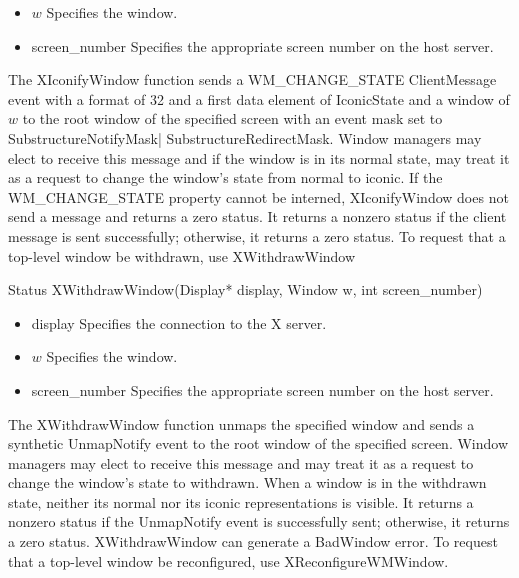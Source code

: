 \documentclass{report}
\begin{document}
\begin{itemize}
\begin{itemize}
\begin{itemize}
                \item $w$ Specifies the window.
                \item screen\_number Specifies the appropriate screen number on the host server.
            \end{itemize}
            The XIconifyWindow function sends a WM\_CHANGE\_STATE ClientMessage event with a format of 32 and a first data element of IconicState and a window of $w$ to the root window of the specified screen with an event mask set to SubstructureNotifyMask| SubstructureRedirectMask. Window managers may elect to receive this message and if the window is in its normal state, may treat it as a request to change the window’s state from normal to iconic. If the WM\_CHANGE\_STATE property cannot be interned, XIconifyWindow does not send a message and returns a zero status. It returns a nonzero status if the client message is sent successfully; otherwise, it returns a zero status.
            \bigbreak \noindent 
            To request that a top-level window be withdrawn, use XWithdrawWindow
            \bigbreak \noindent 
            \begin{cppcode}
            Status XWithdrawWindow(Display* display, Window w, int screen_number)
            \end{cppcode}
            \begin{itemize}
                \item display Specifies the connection to the X server.
                \item $w$ Specifies the window.
                \item screen\_number Specifies the appropriate screen number on the host server.
            \end{itemize}
            The XWithdrawWindow function unmaps the specified window and sends a synthetic UnmapNotify event to the root window of the specified screen. Window managers may elect to receive this message and may treat it as a request to change the window’s state to withdrawn. When a window is in the withdrawn state, neither its normal nor its iconic representations is visible. It returns a nonzero status if the UnmapNotify event is successfully sent; otherwise, it returns a zero status.
            \bigbreak \noindent 
            XWithdrawWindow can generate a BadWindow error.
            \bigbreak \noindent 
            To request that a top-level window be reconfigured, use XReconfigureWMWindow.
            \bigbreak \noindent 
            \begin{cppcode}

\end{cppcode}
\end{itemize}
\end{itemize}
\end{document}
